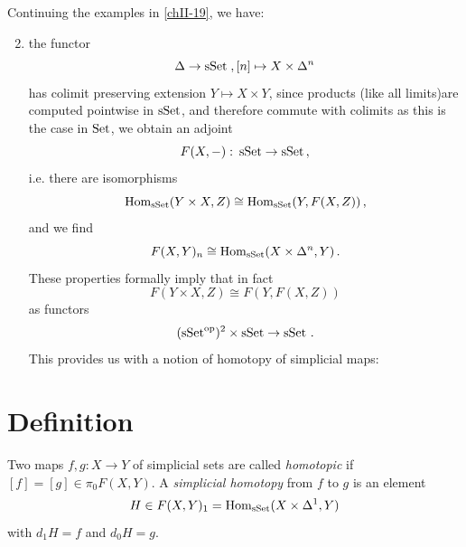         Continuing the examples in \ref{chII-19}, we have:
        \begin{enumerate}[label=\roman*)]
            \setcounter{enumi}{1}
            \item 
                the functor
                \begin{equation*}
                    \Delta \to \operatorname{sSet} \;, [n] \mapsto X \times \Delta^n
                \end{equation*}
                has colimit preserving extension $Y \mapsto X \times Y$, since products (like all limits)are computed pointwise in $\operatorname{sSet}$, and therefore commute with colimits as this is the case in $\operatorname{Set}$, we obtain an adjoint
                \begin{equation*}
                    F(X, -) \,\colon \operatorname{sSet} \to \operatorname{sSet} \,,
                \end{equation*}
                i.e. there are isomorphisms
                \begin{equation*}
                    \operatorname{Hom}_{\operatorname{sSet}}(Y \times X, Z) \cong \operatorname{Hom}_{\operatorname{sSet}}(Y, F(X, Z)) \,,
                \end{equation*}
                and we find
                \begin{equation*}
                    F(X, Y)_n \cong \operatorname{Hom}_{\operatorname{sSet}}(X \times \Delta^n, Y) \,.
                \end{equation*}
                These properties formally imply that in fact
                \begin{equation*}
                    F(Y \times X, Z) \cong F(Y, F(X, Z))
                \end{equation*}
                as functors
                \begin{equation*}
                    (\operatorname{sSet}^{\operatorname{op}})^2 \times \operatorname{sSet} \to \operatorname{sSet} \,.
                \end{equation*}\label{chII-19-ii}
                This provides us with a notion of homotopy of simplicial maps:
        \end{enumerate}
    \section{Definition}
        Two maps $f, g \colon X \to Y$ of simplicial sets are called \emph{homotopic} if $[f] = [g] \in \pi_0 F(X,Y)$. A \emph{simplicial homotopy} from $f$ to $g$ is an element
        \begin{equation*}
            H \in F(X, Y)_1 = \operatorname{Hom}_{\operatorname{sSet}} (X \times \Delta^1, Y)
        \end{equation*}
            with $d_1H = f$ and $d_0H = g$.
        \smallskip

